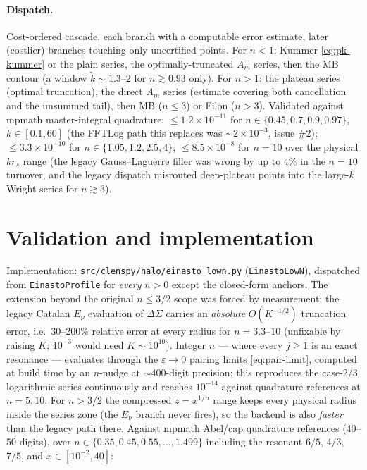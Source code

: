 \documentclass{article}
\begin{document}
\paragraph{Dispatch.} Cost-ordered cascade, each branch with a computable
error estimate, later (costlier) branches touching only uncertified
points. For $n<1$: Kummer \eqref{eq:pk-kummer} or the plain series, the
optimally-truncated $A_m^-$ series, then the MB contour (a window
$\tilde k\sim1.3$--$2$ for $n\gtrsim0.93$ only). For $n>1$: the plateau
series (optimal truncation), the direct $A_m^-$ series (estimate covering
both cancellation and the unsummed tail), then MB ($n\le3$) or Filon
($n>3$). Validated against mpmath master-integral quadrature:
$\le1.2\times10^{-11}$ for $n\in\{0.45,0.7,0.9,0.97\}$,
$\tilde k\in[0.1,60]$ (the FFTLog path this replaces was $\sim2\times
10^{-3}$, issue \#2); $\le3.3\times10^{-10}$ for $n\in\{1.05,1.2,2.5,4\}$;
$\le8.5\times10^{-8}$ for $n=10$ over the physical $k r_s$ range (the
legacy Gauss--Laguerre filler was wrong by up to $4\%$ in the $n=10$
turnover, and the legacy dispatch misrouted deep-plateau points into the
large-$k$ Wright series for $n\gtrsim3$).

\section{Validation and implementation}\label{sec:impl}

Implementation: \texttt{src/clenspy/halo/einasto\_lown.py}
(\texttt{EinastoLowN}), dispatched from \texttt{EinastoProfile} for
\emph{every} $n>0$ except the closed-form anchors. The extension beyond the
original $n\le3/2$ scope was forced by measurement: the legacy Catalan
$E_\nu$ evaluation of $\Delta\Sigma$ carries an \emph{absolute}
$O(K^{-1/2})$ truncation error, i.e.\ 30--200\% relative error at every
radius for $n=3.3$--$10$ (unfixable by raising $K$; $10^{-3}$ would need
$K\sim10^{10}$). Integer $n$ --- where every $j\ge1$ is an exact resonance
--- evaluates through the $\varepsilon\to0$ pairing limits
\eqref{eq:pair-limit}, computed at build time by an $n$-nudge at
$\sim$400-digit precision; this reproduces the case-2/3 logarithmic series
continuously and reaches $10^{-14}$ against quadrature references at
$n=5,10$. For $n>3/2$ the compressed $z=x^{1/n}$ range keeps every physical
radius inside the series zone (the $E_\nu$ branch never fires), so the
backend is also \emph{faster} than the legacy path there. Against mpmath
Abel/cap quadrature references (40--50 digits), over
$n\in\{0.35,0.45,0.55,\dots,1.499\}$ including the resonant $6/5$, $4/3$,
$7/5$, and $x\in[10^{-2},40]$:
\end{document}

